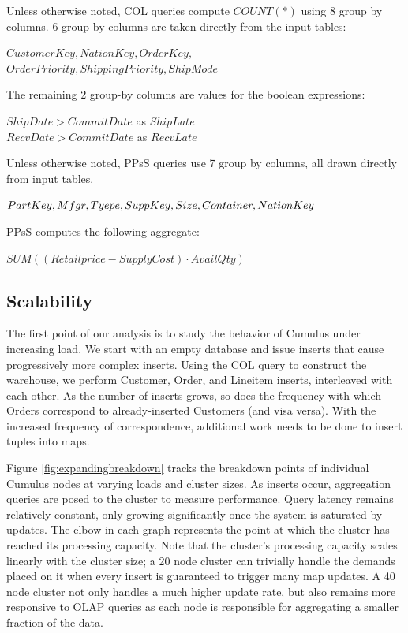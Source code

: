 Unless otherwise noted, COL queries compute $COUNT(*)$ using 8 group by columns.  6 group-by columns are taken directly from the input tables: 

{\noindent $CustomerKey, NationKey, OrderKey,$ \\
$OrderPriority, ShippingPriority, ShipMode$}

\noindent The remaining 2 group-by columns are values for the boolean expressions:

{\noindent $ShipDate > CommitDate$ as $ShipLate$\\
$RecvDate > CommitDate$ as $RecvLate$}

Unless otherwise noted, PPsS queries use 7 group by columns, all drawn directly from input tables.  

{\noindent $PartKey, Mfgr, Tyepe, SuppKey, \\
Size, Container, NationKey$}

PPsS computes the following aggregate:

{\noindent$SUM((Retailprice - SupplyCost) \cdot AvailQty)$}

\subsection{Scalability}

The first point of our analysis is to study the behavior of Cumulus under increasing load.  We start with an empty database and issue inserts that cause progressively more complex inserts.  Using the COL query to construct the warehouse, we perform Customer, Order, and Lineitem inserts, interleaved with each other.  As the number of inserts grows, so does the frequency with which Orders correspond to already-inserted Customers (and visa versa).  With the increased frequency of correspondence, additional work needs to be done to insert tuples into maps.  

Figure \ref{fig:expandingbreakdown} tracks the breakdown points of individual Cumulus nodes at varying loads and cluster sizes.  As inserts occur, aggregation queries are posed to the cluster to measure performance.  Query latency remains relatively constant, only growing significantly once the system is saturated by updates.  The elbow in each graph represents the point at which the cluster has reached its processing capacity.  Note that the cluster's processing capacity scales linearly with the cluster size; a 20 node cluster can trivially handle the demands placed on it when every insert is guaranteed to trigger many map updates.  A 40 node cluster not only handles a much higher update rate, but also remains more responsive to OLAP queries as each node is responsible for aggregating a smaller fraction of the data.

